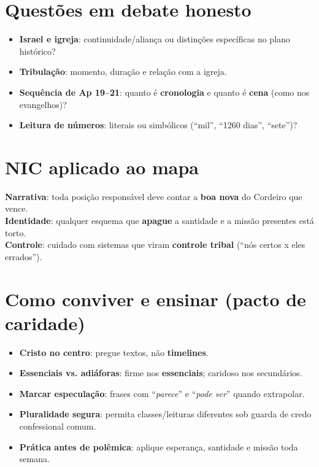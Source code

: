 \section{Questões em debate honesto}
\begin{itemize}[leftmargin=*,noitemsep]
  \item \textbf{Israel e igreja}: continuidade/aliança ou distinções específicas no plano histórico?
  \item \textbf{Tribulação}: momento, duração e relação com a igreja.
  \item \textbf{Sequência de Ap 19--21}: quanto é \textbf{cronologia} e quanto é \textbf{cena} (como nos evangelhos)?
  \item \textbf{Leitura de números}: literais ou simbólicos (``mil'', ``1260 dias'', ``sete'')?
\end{itemize}

\section{NIC aplicado ao mapa}
\begin{nicbox}
\textbf{Narrativa}: toda posição responsável deve contar a \textbf{boa nova} do Cordeiro que vence.\\
\textbf{Identidade}: qualquer esquema que \textbf{apague} a santidade e a missão presentes está torto.\\
\textbf{Controle}: cuidado com sistemas que viram \textbf{controle tribal} (``nós certos x eles errados'').
\end{nicbox}

\section{Como conviver e ensinar (pacto de caridade)}
\begin{checklist}[title={Regras simples para igrejas saudáveis}]
\begin{itemize}[leftmargin=*,noitemsep]
  \item \textbf{Cristo no centro}: pregue textos, não \textbf{timelines}.
  \item \textbf{Essenciais vs. adiáforas}: firme nos \textbf{essenciais}; caridoso nos secundários.
  \item \textbf{Marcar especulação}: frases com ``\emph{parece}'' e ``\emph{pode ser}'' quando extrapolar.
  \item \textbf{Pluralidade segura}: permita classes/leituras diferentes sob guarda de credo confessional comum.
  \item \textbf{Prática antes de polêmica}: aplique esperança, santidade e missão toda semana.
\end{itemize}
\end{checklist}


